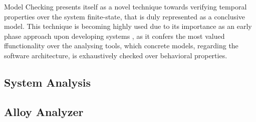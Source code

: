 
Model Checking presents itself as a novel technique towards verifying temporal properties over the system finite-state, that is duly represented as a conclusive model. This technique is becoming highly used due to its importance as an early phase approach upon developing systems \cite{lwspecification}, as it confers the most valued ffunctionality over the analysing tools, which concrete models, regarding the software architecture, is exhaustively checked over behavioral properties. 



\subsection{System Analysis}

\subsection{Alloy Analyzer}


